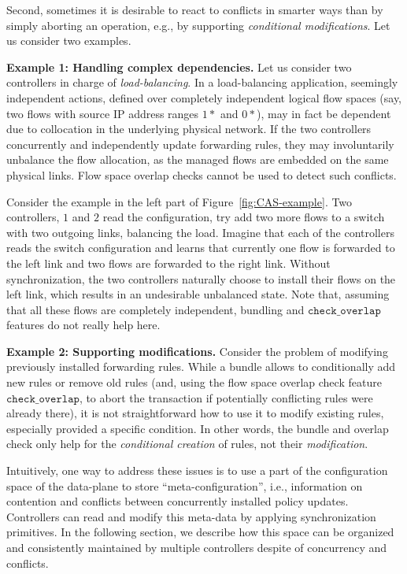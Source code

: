 \documentclass[conference]{sigcomm-alternate}
\newcommand{\checko}{\texttt{check\_overlap}\xspace}
\newcommand{\petr}[1]{\textit{\textcolor{blue}{[petr]: #1}}} %
\begin{document}
Second, sometimes it is desirable to react to conflicts in smarter ways than
by simply aborting an operation, e.g., by supporting \emph{conditional modifications}.
Let us consider two examples.

\vspace{2mm}
\noindent \textbf{Example 1: Handling complex dependencies.} Let us consider two controllers
in charge
of \emph{load-balancing}.
In a load-balancing application, seemingly independent actions, defined over
completely independent logical flow spaces (say, two flows with source IP address ranges $1*$ and $0*$),
may in fact be dependent due to collocation in the underlying physical network.
If the two controllers concurrently and independently
update forwarding rules,
they may involuntarily
unbalance the flow allocation, as the managed flows are embedded
on the same physical links.
Flow space overlap checks cannot be used to detect
such conflicts.

Consider the example in the left part of Figure~\ref{fig:CAS-example}. Two controllers,
$1$ and $2$ read the configuration, try add two more flows to a switch
with two outgoing links, balancing the load.  
Imagine that each of the controllers reads the switch configuration and
learns that currently one flow is forwarded to the left link and two
flows are forwarded to the right link.
Without synchronization, the two controllers naturally choose to
install their flows on the left link, which results in an undesirable
unbalanced state. Note that, assuming that all these flows are
completely independent, bundling and $\checko$ features do not really
help here.  


\vspace{2mm}
\noindent\textbf{Example 2: Supporting modifications.} 
Consider the problem of modifying previously installed forwarding rules.
While a bundle allows to conditionally add new rules or remove
old rules (and, using the flow space overlap
check feature $\checko$, to abort the transaction if potentially conflicting
rules were already there), it is not straightforward how to use it to  
modify existing rules, especially provided a specific condition.
In other words, the bundle and overlap check only help
for the \emph{conditional creation} of rules, not their \emph{modification}.


Intuitively, one way to address these issues is to use a part of the
configuration space of the data-plane to store 
``meta-configuration'', i.e., information on contention and conflicts between
concurrently installed policy updates. Controllers can read and modify
this meta-data by applying synchronization primitives. 
In the following section, we
describe how this space can be organized and consistently maintained
by multiple controllers despite of concurrency and conflicts.    
\end{document}
